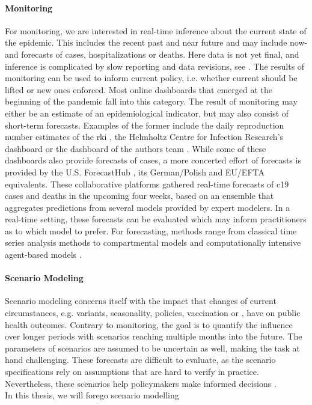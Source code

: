 \paragraph{Monitoring}
For monitoring, we are interested in real-time inference about the current state of the epidemic. This includes the recent past and near future and may include now- and forecasts of cases, hospitalizations or deaths. Here data is not yet final, and inference is complicated by slow reporting and data revisions, see . The results of monitoring can be used to inform current policy, i.e. whether current  should be lifted or new ones enforced. Most online dashboards that emerged at the beginning of the pandemic fall into this category. The result of monitoring may either be an estimate of an epidemiological indicator, but may also consist of short-term forecasts. Examples of the former include the daily reproduction number estimates of the \acrshort{rki} \cite{AnDerHeiden2020Schatzung}, the Helmholtz Centre for Infection Research's dashboard \cite{Khailaie2021Development} or the dashboard of the authors team \cite{Hotz2020Monitoring}.
While some of these dashboards also provide forecasts of cases, a more concerted effort of forecasts is provided by the U.S. ForecastHub \cite{Ray2020Ensemble}, its German/Polish \cite{Bracher2021Preregistered,Bracher2022National} and EU/EFTA \cite{Sherratt2022Predictive} equivalents. These collaborative platforms gathered real-time forecasts of \acrshort{c19} cases and deaths in the upcoming four weeks, based on an ensemble that aggregates predictions from several models provided by expert modelers. In a real-time setting, these forecasts can be evaluated which may inform practitioners as to which model to prefer. 
For forecasting, methods range from classical time series analysis methods \cite{Arroyo-Marioli2021Tracking} to compartmental models \cite{Khailaie2021Development} and computationally intensive agent-based models \cite{Adamik2020Mitigation}.

\paragraph{Scenario Modeling}
Scenario modeling concerns itself with the impact that changes of current circumstances, e.g. variants, seasonality, policies, vaccination or , have on public health outcomes. Contrary to monitoring, the goal is to quantify the influence over longer periods with scenarios reaching multiple months into the future. The parameters of scenarios are assumed to be uncertain as well, making the task at hand challenging. These forecasts are difficult to evaluate, as the scenario specifications rely on assumptions that are hard to verify in practice. Nevertheless, these scenarios help policymakers make informed decisions \cite{Borchering2023Public}.
\\[2\textheight]

In this thesis, we will forego scenario modelling